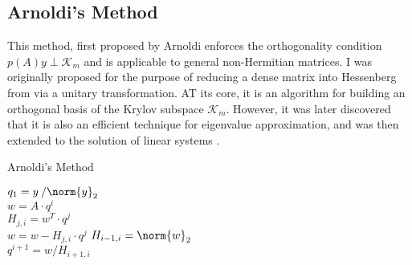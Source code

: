 \subsection{Arnoldi's Method}
\label{sec:arnoldi}
This method, first proposed by Arnoldi \cite{arnoldi_principle_1951} enforces the orthogonality condition $p(A)y \perp \mathcal{K}_m$ and is applicable to general non-Hermitian matrices. I was originally proposed for the purpose of reducing a dense matrix into Hessenberg from via a unitary transformation. AT its core, it is an algorithm for building an orthogonal basis of the Krylov subspace $\mathcal{K}_m$. However, it was later discovered that it is also an efficient technique for eigenvalue approximation, and was then extended to the solution of linear systems \cite{saad_iterative_2003}. 

\begin{algorithm}[h]
  \caption{Arnoldi's Method}
  \label{alg:arnoldi}
  \SetAlgoLined
  $q_1= y\:/\norm{y}_2$ \\
   {
    $w =A\cdot q^i$ \\
     {
      $H_{j,i} = w^T\cdot q^j$ \\
      $ w = w - H_{j,i}\cdot q^j$}
    $H_{i-1,i} = \norm{w}_2$ \\
    $q^{i+1} = w/H_{i+1,i}$
  }
\end{algorithm}

